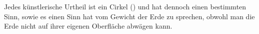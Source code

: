 Jedes künstlerische Urtheil ist ein Cirkel () und hat dennoch einen bestimmten Sinn, sowie es einen Sinn hat vom Gewicht der Erde zu sprechen, obwohl man die Erde nicht auf ihrer eigenen Oberfläche abwägen kann.
\par

